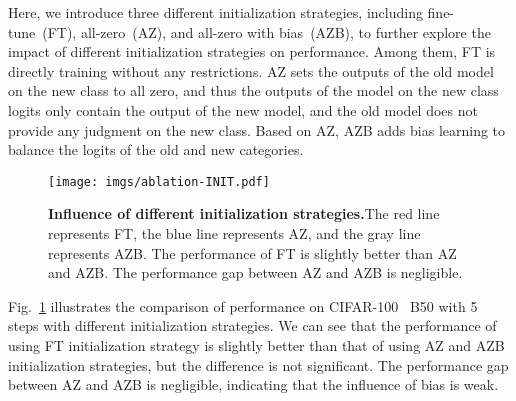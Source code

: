 \documentclass[runningheads]{llncs}
\begin{document}
Here, we introduce three different initialization strategies, including fine-tune~(FT), all-zero~(AZ), and all-zero with bias~(AZB), to further explore the impact of different initialization strategies on performance. Among them, FT is directly training  without any restrictions. AZ sets the outputs of the old model on the new class to all zero, and thus the outputs of the model on the new class logits only contain the output of the new model, and the old model does not provide any judgment on the new class. Based on AZ, AZB adds bias learning to balance the logits of the old and new categories. 
\begin{figure}[t]
    \centering
    \texttt{[image: imgs/ablation-INIT.pdf]}
    \caption{\textbf{Influence of different initialization strategies.}The red line represents FT, the blue line represents AZ, and the gray line represents AZB. 
The performance of FT is slightly better than AZ and AZB. The performance gap between AZ and AZB is negligible.}
    \label{fig:o}
\end{figure}
Fig.~\ref{fig:o} illustrates the comparison of performance on CIFAR-100~\cite{cifar100} B50 with 5 steps with different initialization strategies. We can see that the performance of using FT initialization strategy is slightly better than that of using AZ and AZB initialization strategies, but the difference is not significant. The performance gap between AZ and AZB is negligible, indicating that the influence of bias is weak.
\end{document}
